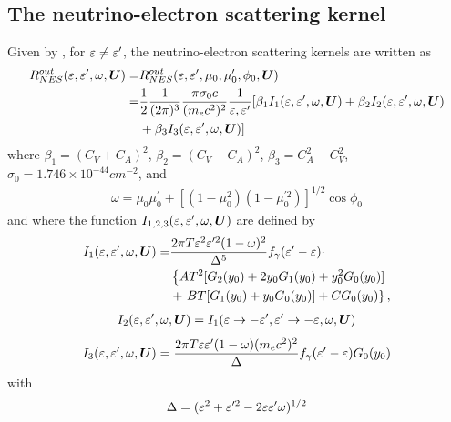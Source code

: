 \documentclass[10pt,preprint]{aastex}
\begin{document}
\subsection{The neutrino-electron scattering kernel}
Given by \citet{bruenn_1985}, for $\varepsilon \neq \varepsilon^\prime$, the neutrino-electron scattering kernels are written as
\begin{align}
    R^{out}_{NES}(\varepsilon,\varepsilon^\prime,\omega, \boldsymbol{U}) = & R^{out}_{NES}(\varepsilon,\varepsilon^\prime,\mu_0,\mu^\prime_0,\phi_0, \boldsymbol{U}) \nonumber \\
     = &\dfrac{1}{2}\dfrac{1}{(2\pi)^3}\dfrac{\pi \sigma_0 c}{(m_e c^2)^2}\dfrac{1}{\varepsilon, \varepsilon^\prime} [ \beta_1I_1(\varepsilon,\varepsilon^\prime,\omega,\boldsymbol{U}) + \beta_2I_2(\varepsilon,\varepsilon^\prime,\omega, \boldsymbol{U}) \nonumber \\
    & +  \beta_3I_3(\varepsilon,\varepsilon^\prime,\omega, \boldsymbol{U})] 
\end{align}
where $\beta_1 = (C_V + C_A)^2$, $\beta_2 = (C_V -C_A)^2$, $\beta_3 = C_A^2 - C_V^2$, $\sigma_0 = 1.746 \times 10^{-44} cm^{-2}$, and
\begin{align}
\omega = \mu_0 \mu_0^\prime + [(1-\mu_0^2)(1-\mu_0^{\prime 2})]^{1/2}\cos\phi_0
\end{align}
and where the function $I_{1,2,3}(\varepsilon,\varepsilon^\prime,\omega, \boldsymbol{U})$ are defined by 
\begin{align}
I_1(\varepsilon, \varepsilon^\prime, \omega, \boldsymbol{U}) = & \dfrac{2\pi T \varepsilon^2 \varepsilon^{\prime 2}(1-\omega)^2}{\Delta^5} f_\gamma(\varepsilon^\prime - \varepsilon) \cdot \\
& \left\lbrace  A T^2 [G_2(y_0)+2y_0G_1(y_0)+y_0^2G_0(y_0)] \right.\nonumber\\
& + \left. BT[G_1(y_0)+y_0G_0(y_0)] + CG_0(y_0)\right\rbrace,
\end{align}
\begin{align}
I_2(\varepsilon, \varepsilon^\prime, \omega, \boldsymbol{U})  = I_1(\varepsilon \rightarrow -\varepsilon^\prime, \varepsilon^\prime\rightarrow -\varepsilon, \omega, \boldsymbol{U}) 
\end{align}
\begin{align}
I_3(\varepsilon, \varepsilon^\prime, \omega, \boldsymbol{U})  = \dfrac{2\pi T \varepsilon \varepsilon^{\prime}(1-\omega)(m_ec^2)^2}{\Delta} f_\gamma(\varepsilon^\prime - \varepsilon) G_0(y_0)
\end{align}
with
\begin{align}
\Delta = (\varepsilon^2 + \varepsilon^{\prime 2} - 2\varepsilon \varepsilon^\prime
\omega)^{1/2}
\end{align}
\end{document}
